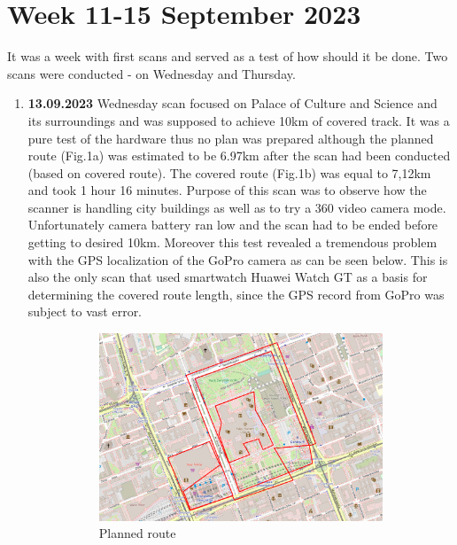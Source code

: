 \documentclass[a4paper,12pt]{article}
\begin{document}
\section{Week 11-15 September 2023}
It was a week with first scans and served as a test of how should it be done. Two scans were conducted - on Wednesday and Thursday. 
\begin{enumerate}
	\item \textbf{13.09.2023} Wednesday scan focused on Palace of Culture and Science and its surroundings and was supposed to achieve 10km of covered track. It was a pure test of the hardware thus no plan was prepared although the planned route (Fig.1a) was estimated to be 6.97km after the scan had been conducted (based on covered route). The covered route (Fig.1b) was equal to 7,12km and took 1 hour 16 minutes. Purpose of this scan was to observe how the scanner is handling city buildings as well as to try a 360 video camera mode. Unfortunately camera battery ran low and the scan had to be ended before getting to desired 10km. Moreover this test revealed a tremendous problem with the GPS localization of the GoPro camera as can be seen below. This is also the only scan that used smartwatch Huawei Watch GT as a basis for determining the covered route length, since the GPS record from GoPro was subject to vast error.
	\begin{figure}[H]
		\centering
		\begin{subfigure}{.90\textwidth}
			\centering
			\includegraphics[width=1\linewidth]{route_p0}
			\caption{Planned route}
			\label{fig:a0}
		\end{subfigure}%
		\linebreak
		\begin{subfigure}{.90\textwidth}

\end{subfigure}
\end{figure}
\end{enumerate}
\end{document}
